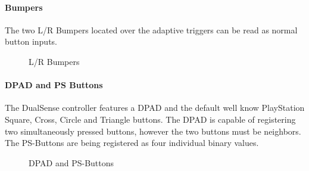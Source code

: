 \paragraph{Bumpers}
The two L/R Bumpers located over the adaptive triggers can be read as normal button inputs.
\begin{figure}[H]
    \centering
    \caption{L/R Bumpers}
\end{figure}

\paragraph{DPAD and PS Buttons}
The DualSense controller features a DPAD and the default well know PlayStation Square, Cross, Circle and Triangle buttons. The DPAD is capable of registering two simultaneously pressed buttons, however the two buttons must be neighbors. The PS-Buttons are being registered as four individual binary values.
\begin{figure}[H]
    \centering
    \caption{DPAD and PS-Buttons}
\end{figure}

